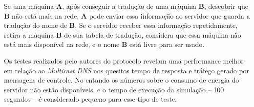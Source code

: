     Se uma máquina \textbf{A}, após conseguir a tradução de uma máquina \textbf{B},
    descobrir que \textbf{B} não está mais na rede, \textbf{A} pode enviar essa 
    informação ao servidor que guarda a tradução do nome de \textbf{B}. Se o servidor
    receber essa informação repetidamente, retira a máquina \textbf{B} de sua 
    tabela de tradução, considera que essa máquina não está mais disponível na 
    rede, e o nome \textbf{B} está livre para ser usado.
  
    Os testes realizados pelo autores do protocolo revelam uma performance melhor
    em relação ao \textit{Multicast DNS} nos quesitos tempo de resposta e tráfego
    gerado por mensagens de controle. No entando os números sobre o consumo de 
    energia do servidor não estão disponíveis, e o tempo de execução da simulação
    -- 100 segundos -- é considerado pequeno para esse tipo de teste.